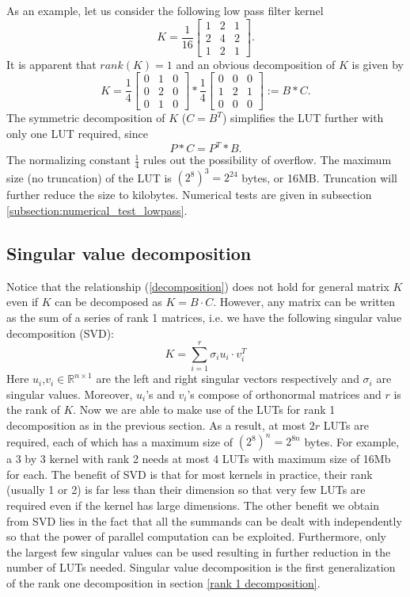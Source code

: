 \documentclass[12pt]{amsart}
\theoremstyle{definition}
\theoremstyle{remark}
\numberwithin{thm}{section}
\begin{document}
As an example, let us consider the following low pass filter kernel
$$
K=\frac{1}{16}
\begin{bmatrix}
1 & 2 & 1\\
2 & 4 & 2\\
1 & 2 & 1
\end{bmatrix}.
$$
It is apparent that $rank(K)=1$ and an obvious decomposition of $K$ is given by 
$$
K=\frac{1}{4}
\begin{bmatrix}
0 & 1 & 0\\
0 & 2 & 0\\
0 & 1 & 0
\end{bmatrix}*\frac{1}{4}
\begin{bmatrix}
0 & 0 & 0\\
1 & 2 & 1\\
0 & 0 & 0
\end{bmatrix}:= B*C.
$$
The symmetric decomposition of $K$ ($C=B^T$) simplifies the LUT further with only one LUT required, since
\[P*C=P^T*B.\]
The normalizing constant $\frac{1}{4}$ rules out the possibility of overflow. The maximum size (no truncation) of the LUT is $(2^8)^3=2^{24}$ bytes, or 16MB. Truncation will further reduce the size to kilobytes. Numerical tests are given in subsection \ref{subsection:numerical_test_lowpass}. 
\subsection{Singular value decomposition}
Notice that the relationship (\ref{decomposition}) does not hold for general matrix $K$ even if $K$ can be decomposed as $K=B\cdot C$. However, any matrix can be written as the sum of a series of rank 1 matrices, i.e. we have the following singular value decomposition (SVD): 
\[K=\sum_{i=1}^{r}\sigma_i u_i\cdot v_i^T\]
Here $u_i$,$v_i\in\mathbb{R}^{n\times 1}$ are the left and right singular vectors respectively and $\sigma_i$ are singular values. Moreover, $u_i$'s and $v_i$'s compose of orthonormal matrices and $r$ is the rank of $K$. Now we are able to make use of the LUTs for rank 1 decomposition as in the previous section. As a result, at most $2r$ LUTs are required, each of which has a maximum size of $(2^8)^n=2^{8n}$ bytes. For example, a 3 by 3 kernel with rank 2 needs at most 4 LUTs with maximum size of 16Mb for each. The benefit of SVD is that for most kernels in practice, their rank (usually 1 or 2) is far less than their dimension so that very few LUTs are required even if the kernel has large dimensions. The other benefit we obtain from SVD lies in the fact that all the summands can be dealt with independently so that the power of parallel computation can be exploited. Furthermore, only the largest few singular values can be used resulting in further reduction in the number of LUTs needed. Singular value decomposition is the first generalization of the rank one decomposition in section \ref{rank 1 decomposition}. 
\end{document}
